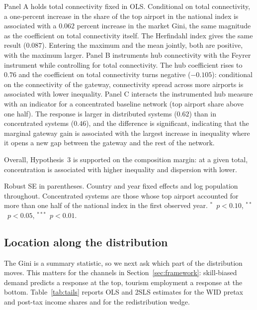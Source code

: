 \documentclass[12pt]{article}
\newcommand{\sym}[1]{\ensuremath{^{#1}}}
\begin{document}
Panel A holds total connectivity fixed in OLS. Conditional on total connectivity, a one-percent increase in the share of the top airport in the national index is associated with a $0.062$ percent increase in the market Gini, the same magnitude as the coefficient on total connectivity itself. The Herfindahl index gives the same result ($0.087$). Entering the maximum and the mean jointly, both are positive, with the maximum larger. Panel B instruments hub connectivity with the Feyrer instrument while controlling for total connectivity. The hub coefficient rises to $0.76$ and the coefficient on total connectivity turns negative ($-0.105$): conditional on the connectivity of the gateway, connectivity spread across more airports is associated with lower inequality. Panel C interacts the instrumented hub measure with an indicator for a concentrated baseline network (top airport share above one half). The response is larger in distributed systems ($0.62$) than in concentrated systems ($0.46$), and the difference is significant, indicating that the marginal gateway gain is associated with the largest increase in inequality where it opens a new gap between the gateway and the rest of the network.

Overall, Hypothesis~3 is supported on the composition margin: at a given total, concentration is associated with higher inequality and dispersion with lower.

\begin{table}[H]\centering\caption{Network concentration and inequality.}\label{tab:conc}
\begin{threeparttable}\small
\begin{tablenotes}\footnotesize\item Robust SE in parentheses. Country and year fixed effects and log population throughout. Concentrated systems are those whose top airport accounted for more than one half of the national index in the first observed year. \sym{*}~$p<0.10$, \sym{**}~$p<0.05$, \sym{***}~$p<0.01$.\end{tablenotes}\end{threeparttable}\end{table}

\subsection{Location along the distribution}
\label{sec:tails}
The Gini is a summary statistic, so we next ask which part of the distribution moves. This matters for the channels in Section~\ref{sec:framework}: skill-biased demand predicts a response at the top, tourism employment a response at the bottom. Table~\ref{tab:tails} reports OLS and 2SLS estimates for the WID pretax and post-tax income shares and for the redistribution wedge.
\end{document}
